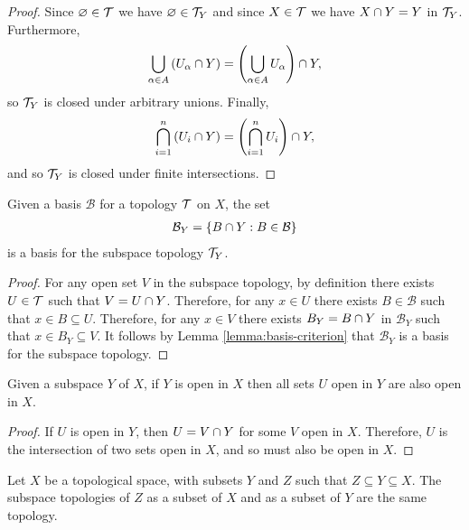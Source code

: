 \begin{proof}
    Since $\varnothing \in \mathcal{T}$ we have $\varnothing \in \mathcal{T}_Y$ and since $X \in \mathcal{T}$ we have $X \cap Y = Y$ in $\mathcal{T}_Y$. Furthermore,
    \begin{align*}
        \bigcup_{\alpha \in A}\left(U_{\alpha} \cap Y\right) = \left(\bigcup_{\alpha \in A}U_{\alpha}\right) \cap Y,
    \end{align*}
    so $\mathcal{T}_Y$ is closed under arbitrary unions. Finally,
    \begin{align*}
        \bigcap_{i=1}^{n}\left(U_i \cap Y\right) = \left(\bigcap_{i=1}^{n}U_i\right) \cap Y,
    \end{align*}
    and so $\mathcal{T}_Y$ is closed under finite intersections.
\end{proof}

\begin{lemma}\label{lemma:subspace-basis}
    Given a basis $\mathcal{B}$ for a topology $\mathcal{T}$ on $X$, the set
    \begin{align*}
        \mathcal{B}_Y = \left\{B \cap Y : B \in \mathcal{B}\right\}
    \end{align*}
    is a basis for the subspace topology $\mathcal{T}_Y$.
\end{lemma}

\begin{proof}
    For any open set $V$ in the subspace topology, by definition there exists $U \in \mathcal{T}$ such that $V = U \cap Y$. Therefore, for any $x \in U$ there exists $B \in \mathcal{B}$ such that $x \in B \subseteq U$. Therefore, for any $x \in V$ there exists $B_Y = B \cap Y$ in $\mathcal{B}_Y$ such that $x \in B_Y \subseteq V$. It follows by Lemma \ref{lemma:basis-criterion} that $\mathcal{B}_Y$ is a basis for the subspace topology.
\end{proof}

\begin{thm}
    Given a subspace $Y$ of $X$, if $Y$ is open in $X$ then all sets $U$ open in $Y$ are also open in $X$.
\end{thm}

\begin{proof}
    If $U$ is open in $Y$, then $U = V \cap Y$ for some $V$ open in $X$. Therefore, $U$ is the intersection of two sets open in $X$, and so must also be open in $X$.
\end{proof}

\begin{lemma}
    Let $X$ be a topological space, with subsets $Y$ and $Z$ such that $Z \subseteq Y \subseteq X$. The subspace topologies of $Z$ as a subset of $X$ and as a subset of $Y$ are the same topology.
\end{lemma}

